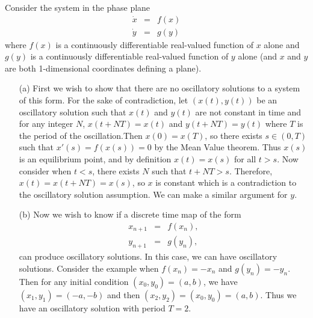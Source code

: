 \documentclass[12pt]{report}
\begin{document}
\begin{solution}

    \noindent
    Consider the system in the phase plane
    \begin{eqnarray*} 
        \dot x &=& f(x) \\
        \dot y &=& g(y) 
    \end{eqnarray*} 
    where $f(x)$ is a continuously differentiable real-valued function of $x$ alone and $g(y)$ is a continuously differentiable real-valued function of $y$ alone (and $x$ and $y$ are both 1-dimensional coordinates defining a plane).
    \begin{enumerate}
        \item [(a)]
        First we wish to show that there are no oscillatory solutions to a system of this form. For the sake of contradiction, let $(x(t), y(t))$ be an oscillatory solution such that $x(t)$ and $y(t)$ are not constant in time and for any integer $N$, $x(t+N T) = x(t)$ and $y(t+N T) = y(t)$ where $T$ is the period of the oscillation.Then $x(0) = x(T)$, so there exists $s\in(0,T)$ such that $x'(s) = f(x(s)) = 0$ by the Mean Value theorem. Thus $x(s)$ is an equilibrium point, and by definition $x(t) = x(s)$ for all $t>s$. Now consider when $t<s$, there exists $N$ such that $t + NT > s$. Therefore, $x(t) = x(t + NT) = x(s)$, so $x$ is constant which is a contradiction to the oscillatory solution assumption. We can make a similar argument for $y$. 

        \item [(b)]
        Now we wish to know if a discrete time map of the form
        \begin{eqnarray*} 	
            x_{n+1} &=& f(x_n), \\
            y_{n+1} &=& g(y_n), 
        \end{eqnarray*}
        can produce oscillatory solutions. In this case, we can have oscillatory solutions. Consider the example when $f(x_n) = -x_{n}$ and $g(y_n) = -y_{n}$. Then for any initial condition $(x_0, y_0) = (a,b)$, we have $(x_1, y_1) = (-a,-b)$ and then $(x_2, y_2) = (x_0, y_0) = (a,b)$. Thus we have an oscillatory solution with period $T = 2$.   

    \end{enumerate}


\end{solution}

\newpage
\end{document}
